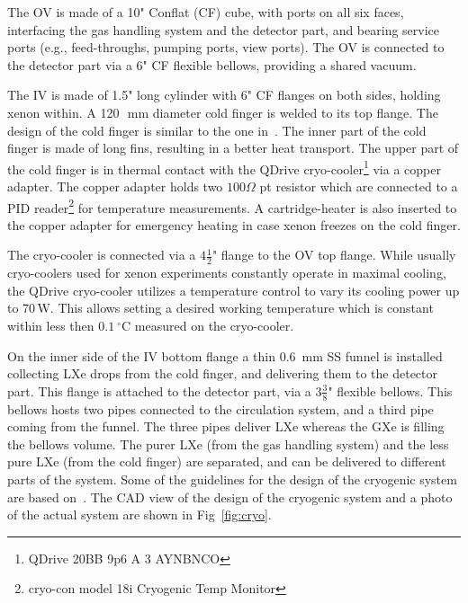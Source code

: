 The OV is made of a 10" Conflat (CF) cube, with ports on all six faces, interfacing the gas handling system and  the detector part, and bearing service ports (e.g., feed-throughs, pumping ports, 
view ports). The OV is connected to the detector part via a 6" CF flexible bellows, providing a shared vacuum.

The IV is made of 1.5" long cylinder with 6" CF flanges on both sides, holding xenon within. A 120~\,mm diameter cold finger is welded to its top flange. The design of the cold finger is similar to the one in~\cite{xe100_instr2012}. The inner part of the cold finger is made of long fins, resulting in a better heat transport.  The upper part of the cold finger is in thermal contact with the 
QDrive cryo-cooler\footnote{QDrive 20BB 9p6 A 3 AYNBNCO} via a copper adapter. The copper adapter 
holds two $100\Omega$ pt resistor which are connected to a PID reader\footnote{cryo-con model 
18i Cryogenic Temp Monitor} for temperature measurements. A cartridge-heater 
is also inserted to the copper adapter for emergency heating in case xenon freezes on the 
cold finger. 

The cryo-cooler is connected via a $4\frac{1}{2}$" 
flange to the OV top flange. While usually cryo-coolers used for 
xenon experiments constantly operate in maximal cooling, the QDrive cryo-cooler utilizes a 
temperature control to vary its cooling power up to 70\,W. This allows setting a desired working temperature which is constant within less then $0.1~\mathrm{^{\circ}C}$ measured on the cryo-cooler.

On the inner side of the IV bottom flange a thin 0.6~mm SS funnel is installed 
collecting LXe drops from the cold finger, and delivering them to the  detector part. 
This flange is attached to the detector part, via a $3\frac{3}{8}$" flexible bellows. This 
bellows hosts two pipes connected to the circulation system, and a third pipe coming 
from the funnel. The three pipes deliver LXe whereas the GXe is filling the bellows volume. The purer LXe (from the gas handling system) and the less pure LXe (from the cold finger) are separated, and can be delivered to different parts of the system. Some of the guidelines for the design of 
the cryogenic system are based on~\cite{Giboni}. The CAD view of 
the design of the cryogenic system and a photo of the actual system are shown in Fig~\ref{fig:cryo}. 

